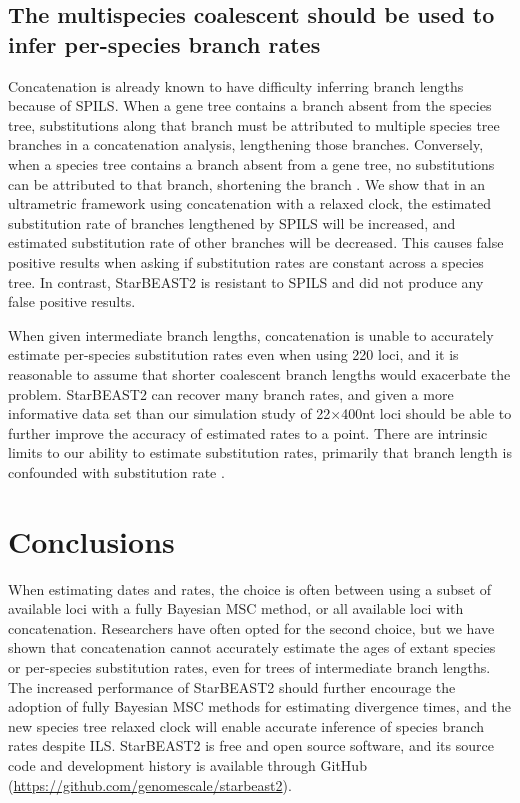 \documentclass[nogrid]{MBE}%
\begin{document}
\subsection{The multispecies coalescent should be used to infer per-species branch rates}

Concatenation is already known to have difficulty inferring branch lengths
because of SPILS. When a gene tree contains a branch absent from the species
tree, substitutions along that branch must be attributed to multiple species tree
branches in a concatenation analysis, lengthening those branches. Conversely,
when a species tree contains a branch absent from a gene tree, no substitutions
can be attributed to that branch, shortening the branch \citep{Mendes01072016}.
We show that in an ultrametric framework using concatenation with a relaxed
clock, the estimated substitution rate of branches lengthened by
SPILS will be increased, and estimated substitution rate of other
branches will be decreased. This causes false positive results when asking if substitution rates
are constant across a species tree. In contrast, StarBEAST2 is resistant to
SPILS and did not produce any false positive results.

When given intermediate branch lengths, concatenation is unable to accurately
estimate per-species substitution rates even when using 220 loci, and it is
reasonable to assume that shorter coalescent branch lengths would
exacerbate the problem. StarBEAST2 can recover many branch rates, and given a
more informative data set than our simulation study of 22$\times$400nt loci
should be able to further improve the accuracy of estimated rates to a point.
There are intrinsic limits to our ability to estimate substitution rates,
primarily that branch length is confounded with substitution rate
\citep{Thorne01092002}.

\section{Conclusions}

When estimating dates and rates, the choice is often between using a subset of
available loci with a fully Bayesian MSC method, or all available loci with
concatenation. Researchers have often opted for the second choice, but we have
shown that concatenation cannot accurately estimate the ages of extant species
or per-species substitution rates, even for trees of intermediate branch lengths. The
increased performance of StarBEAST2 should further encourage the adoption of
fully Bayesian MSC methods for estimating divergence times, and the new species
tree relaxed clock will enable accurate inference of species branch rates despite
ILS. StarBEAST2 is free and open source software, and its source code and
development history is available through GitHub
(\url{https://github.com/genomescale/starbeast2}).
\end{document}
